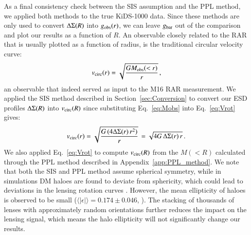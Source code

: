 \documentclass{aa}
\renewcommand{\Upsigma}{{\rm \Sigma}}
\renewcommand{\Updelta}{{\rm \Delta}}
\newcommand*{\meanb}[1]{\langle{#1}\rangle}
\newcommand{\un}[1]{_{\rm #1}}
\begin{document}
As a final consistency check between the SIS assumption and the PPL method, we applied both methods to the true KiDS-1000 data. Since these methods are only used to convert $\Updelta\Upsigma(R)$ into $g\un{obs}(r)$, we can leave $g\un{bar}$ out of the comparison and plot our results as a function of $R$. An observable closely related to the RAR that is usually plotted as a function of radius, is the traditional circular velocity curve:
\begin{equation}\label{eq:Vrot}
v\un{circ}(r) = \sqrt{\frac{G M\un{obs}(<r)}{r}} \, ,
\end{equation}
an observable that indeed served as input to the M16 RAR measurement. We applied the SIS method described in Section~\ref{sec:Conversion} to convert our ESD profiles $\Updelta\Upsigma(R)$ into $v\un{circ}(R)$ since substituting Eq.~\ref{eq:Mobs} into Eq.~\ref{eq:Vrot} gives:
\begin{equation}
v\un{circ}(r) = \sqrt{\frac{G \, (4 \Updelta\Upsigma(r) \, r^2)}{r}} \, = \sqrt{4 G \, \Updelta\Upsigma(r) \, r} \, .
\end{equation}
We also applied Eq.~\ref{eq:Vrot} to compute $v\un{circ}(R)$ from the $M(<R)$ calculated through the PPL method described in Appendix~\ref{app:PPL_method}. We note that both the SIS and PPL method assume spherical symmetry, while in simulations DM haloes are found to deviate from sphericity, which could lead to deviations in the lensing rotation curves \cite[]{cuddeford1993}. However, the mean ellipticity of haloes is observed to be small ($\meanb{|\epsilon|} = 0.174\pm0.046$, \citealp{schrabback2020}). The stacking of thousands of lenses with approximately random orientations further reduces the impact on the lensing signal, which means the halo ellipticity will not significantly change our results.
\end{document}
